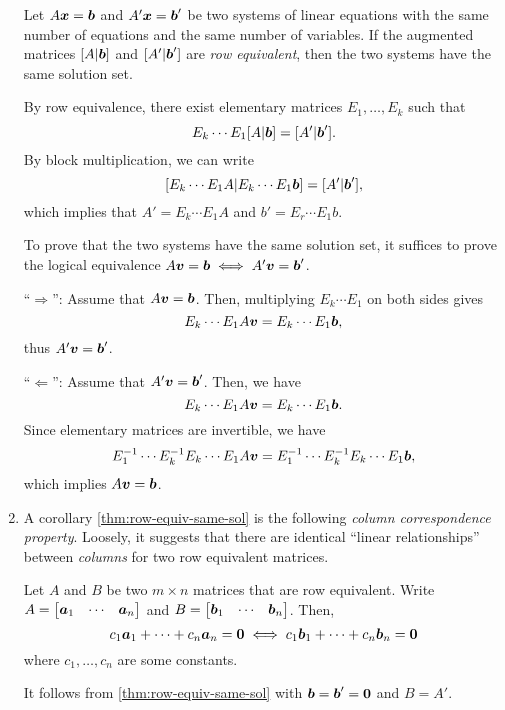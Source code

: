 \begin{enumerate}
\begin{theorem}
\label{thm:row-equiv-same-sol}
Let \(A\vb*{x}=\vb*{b}\) and \(A'\vb*{x}=\vb*{b}'\) be two systems of
linear equations with the same number of equations and the same number of
variables. If the augmented matrices \([A|\vb*{b}]\) and \([A'|\vb*{b}']\) are
\emph{row equivalent}, then the two systems have the same solution set.
\end{theorem}
\begin{pf}
By row equivalence, there exist elementary matrices \(E_1,\dotsc,E_k\) such
that
\[
E_k\dotsb E_1[A|\vb*{b}]=[A'|\vb*{b}'].
\]
By block multiplication, we can write
\[
[E_k\dotsb E_1A|E_k\dotsb E_1\vb*{b}]=[A'|\vb*{b}'],
\]
which implies that \(A'=E_{k}\dotsb E_1A\) and \(b'=E_{r}\dotsb E_1b\).

To prove that the two systems have the same solution set, it suffices to prove
the logical equivalence \(A\vb*{v}=\vb*{b}\iff A'\vb*{v}=\vb*{b}'\).

``\(\Rightarrow\)'': Assume that \(A\vb*{v}=\vb*{b}\). Then, multiplying
\(E_k\dotsb E_1\) on both sides gives
\[
E_{k}\dotsb E_1A\vb*{v}=E_{k}\dotsb E_1\vb*{b},
\]
thus \(A'\vb*{v}=\vb*{b}'\).

``\(\Leftarrow\)'': Assume that \(A'\vb*{v}=\vb*{b}'\). Then, we have
\[
E_{k}\dotsb E_1A\vb*{v}=E_{k}\dotsb E_1\vb*{b}.
\]
Since elementary matrices are invertible, we have
\[
E_{1}^{-1}\dotsb E_{k}^{-1}E_{k}\dotsb E_1A\vb*{v}=E_{1}^{-1}\dotsb E_{k}^{-1}E_{k}\dotsb E_1\vb*{b},
\]
which implies \(A\vb*{v}=\vb*{b}\).
\end{pf}

\item A corollary \cref{thm:row-equiv-same-sol} is the following \emph{column
correspondence property}. Loosely, it suggests that there are identical ``linear
relationships'' between \emph{columns} for two row equivalent matrices.

\begin{corollary}
\label{cor:col-correspond}
Let \(A\) and \(B\) be two \(m\times n\) matrices that are row equivalent.
Write \(A=\mqty[\vect{a}_{1}&\cdots&\vect{a}_{n}]\) and
\(B=\mqty[\vect{b}_{1}&\cdots&\vect{b}_{n}]\). Then,
\[
c_1\vb*{a}_{1}+\dotsb+c_n\vb*{a}_{n}=\vb*{0}\iff
c_1\vb*{b}_{1}+\dotsb+c_n\vb*{b}_{n}=\vb*{0}
\]
where \(c_1,\dotsc,c_n\) are some constants.
\end{corollary}
\begin{pf}
It follows from \cref{thm:row-equiv-same-sol} with
\(\vb*{b}=\vb*{b}'=\vb*{0}\) and \(B=A'\).
\end{pf}


\end{enumerate}
